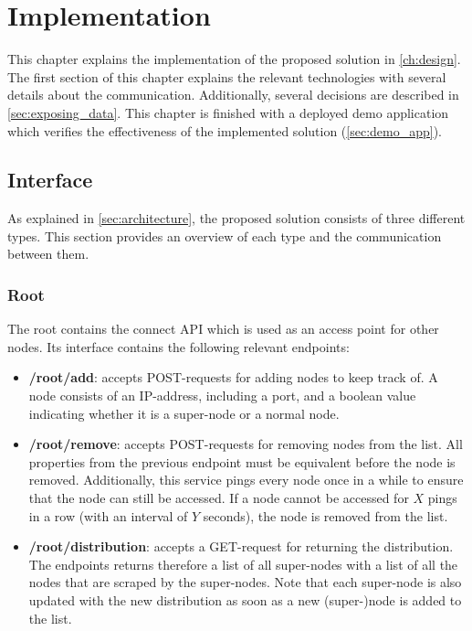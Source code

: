 \chapter{Implementation}\label{ch:implementation}
This chapter explains the implementation of the proposed solution in \autoref{ch:design}. The first section of this chapter explains the relevant technologies with several details about the communication. Additionally, several decisions are described in \autoref{sec:exposing_data}. This chapter is finished with a deployed demo application which verifies the effectiveness of the implemented solution (\autoref{sec:demo_app}).

\section{Interface} \label{sec:interface}
As explained in \autoref{sec:architecture}, the proposed solution consists of three different types. This section provides an overview of each type and the communication between them.

\subsection{Root} \label{sec:impl-root}
The root contains the connect API which is used as an access point for other nodes. Its interface contains the following relevant endpoints:

\begin{itemize}
    \item \textbf{/root/add}: accepts POST-requests for adding nodes to keep track of. A node consists of an IP-address, including a port, and a boolean value indicating whether it is a super-node or a normal node.
    \item \textbf{/root/remove}: accepts POST-requests for removing nodes from the list. All properties from the previous endpoint must be equivalent before the node is removed. Additionally, this service pings every node once in a while to ensure that the node can still be accessed. If a node cannot be accessed for $X$ pings in a row (with an interval of $Y$ seconds), the node is removed from the list.
    \item \textbf{/root/distribution}: accepts a GET-request for returning the distribution. The endpoints returns therefore a list of all super-nodes with a list of all the nodes that are scraped by the super-nodes. Note that each super-node is also updated with the new distribution as soon as a new (super-)node is added to the list. 
\end{itemize}

